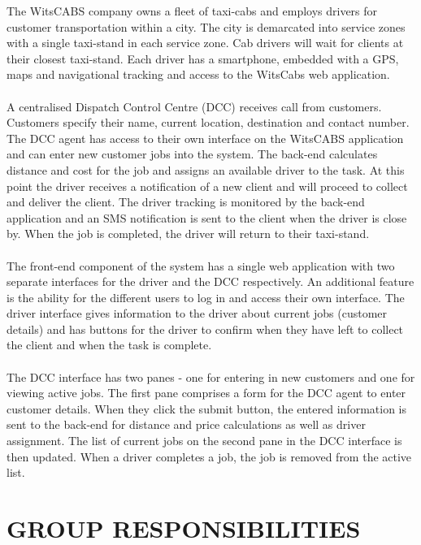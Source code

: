 \documentclass[10pt,twocolumn]{witseiepaper}
\begin{document}
The WitsCABS company owns a fleet of taxi-cabs and employs drivers for customer transportation within a city. The city is demarcated into service zones with a single taxi-stand in each service zone. Cab drivers will wait for clients at their closest taxi-stand. Each driver has a smartphone, embedded with a GPS, maps and navigational tracking and  access to the WitsCabs web application. \\ \\
A centralised Dispatch Control Centre (DCC) receives call from customers. Customers specify their name, current location, destination and contact number. The DCC agent has access to their own interface on the WitsCABS application and can enter new customer jobs into the system. The back-end calculates distance and cost for the job and assigns an available driver to the task. At this point the driver receives a notification of a new client and will proceed to collect and deliver the client. The driver tracking is monitored by the back-end application and an SMS notification is sent to the client when the driver is close by. When the job is completed, the driver will return to their taxi-stand.\\
\\
The front-end component of the system has a single web application with two separate interfaces for the driver and the DCC respectively. An additional feature is the ability for the different users to log in and access their own interface. The driver interface gives information to the driver about current jobs (customer details) and has buttons for the driver to confirm when they have left to collect the client and when the task is complete.\\ \\
The DCC interface has two panes - one for entering in new customers and one for viewing active jobs. The first pane comprises a form for the DCC agent to enter customer details. When they click the submit button, the entered information is sent to the back-end for distance and price calculations as well as driver assignment. The list of current jobs on the second pane in the DCC interface is then updated. When a driver completes a job, the job is removed from the active list.  


%
\section{GROUP RESPONSIBILITIES}
\end{document}
